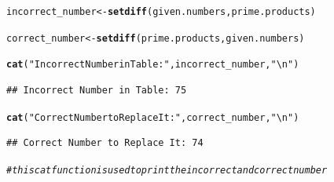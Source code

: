 \documentclass{article}\usepackage[]{graphicx}\usepackage[]{xcolor}
\makeatletter
\newcommand{\hlsng}[1]{\textcolor[rgb]{0.192,0.494,0.8}{#1}}%
\newcommand{\hlcom}[1]{\textcolor[rgb]{0.678,0.584,0.686}{\textit{#1}}}%
\newcommand{\hldef}[1]{\textcolor[rgb]{0.345,0.345,0.345}{#1}}%
\newcommand{\hlkwb}[1]{\textcolor[rgb]{0.69,0.353,0.396}{#1}}%
\newcommand{\hlkwd}[1]{\textcolor[rgb]{0.737,0.353,0.396}{\textbf{#1}}}%
\newenvironment{kframe}{%
 \def\at@end@of@kframe{}%
 \ifinner\ifhmode%
  \def\at@end@of@kframe{\end{minipage}}%
  \begin{minipage}{\columnwidth}%
 \fi\fi%
 \def\FrameCommand##1{\hskip\@totalleftmargin \hskip-\fboxsep
 \colorbox{shadecolor}{##1}\hskip-\fboxsep
     \hskip-\linewidth \hskip-\@totalleftmargin \hskip\columnwidth}%
 \MakeFramed {\advance\hsize-\width
   \@totalleftmargin\z@ \linewidth\hsize
   \@setminipage}}%
 {\par\unskip\endMakeFramed%
 \at@end@of@kframe}
\newenvironment{knitrout}{}{} %
\makeatother
\begin{document}
\begin{enumerate}
\begin{knitrout}
\begin{kframe}
\begin{alltt}
\hldef{incorrect_number} \hlkwb{<-} \hlkwd{setdiff}\hldef{(given.numbers, prime.products)}

\hldef{correct_number} \hlkwb{<-} \hlkwd{setdiff}\hldef{(prime.products, given.numbers)}

\hlkwd{cat}\hldef{(}\hlsng{"Incorrect Number in Table:"}\hldef{, incorrect_number,} \hlsng{"\textbackslash{}n"}\hldef{)}
\end{alltt}
\begin{verbatim}
## Incorrect Number in Table: 75
\end{verbatim}
\begin{alltt}
\hlkwd{cat}\hldef{(}\hlsng{"Correct Number to Replace It:"}\hldef{, correct_number,} \hlsng{"\textbackslash{}n"}\hldef{)}
\end{alltt}
\begin{verbatim}
## Correct Number to Replace It: 74
\end{verbatim}
\begin{alltt}
\hlcom{#this cat function is used to print the incorrect and correct number}
\end{alltt}
\end{kframe}
\end{knitrout}
\end{enumerate}


\end{document}
